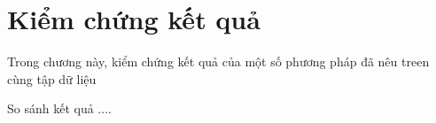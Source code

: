 \chapter{Kiểm chứng kết quả}
Trong chương này, kiểm chứng kết quả của một số phương pháp đã nêu treen cùng tập dữ liệu

So sánh kết quả ....
